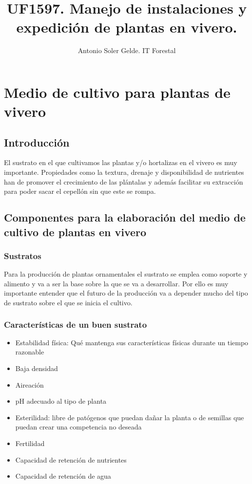 \documentclass[a4paper,12pt,oneside]{article}
\author{Antonio Soler Gelde. IT Forestal}
\date{}
\title{UF1597. Manejo de instalaciones y expedición de plantas en vivero.}
\begin{document}
\maketitle
\tableofcontents
\newpage
\section{Medio de cultivo para plantas de vivero}
\label{sec:org482fd79}
\subsection{Introducción}
\label{sec:orge2fada8}
El sustrato en el que cultivamos las plantas y/o hortalizas en el vivero es muy
importante. Propiedades como la textura, drenaje y disponibilidad de nutrientes
han de promover el crecimiento de las plántalas y además facilitar su extracción
para poder sacar el cepellón sin que este se rompa.
\subsection{Componentes para la elaboración del medio de cultivo de plantas en vivero}
\label{sec:orgb741fae}
\subsubsection{Sustratos}
\label{sec:orgc977e36}
Para la producción de plantas ornamentales el sustrato se emplea como soporte y
alimento y va a ser la base sobre la que se va a desarrollar. Por ello es muy
importante entender que el futuro de la producción va a depender mucho del tipo
de sustrato sobre el que se inicia el cultivo. 
\subsubsection{Características de un buen sustrato}
\label{sec:org4d8f660}
\begin{itemize}
\item Estabilidad física: Qué mantenga sus características físicas durante un
tiempo razonable
\item Baja densidad
\item Aireación
\item pH adecuado al tipo de planta
\item Esterilidad: libre de patógenos que puedan dañar la planta o de semillas que
puedan crear una competencia no deseada
\item Fertilidad
\item Capacidad de retención de nutrientes
\item Capacidad de retención de agua
\end{itemize}
\end{document}
